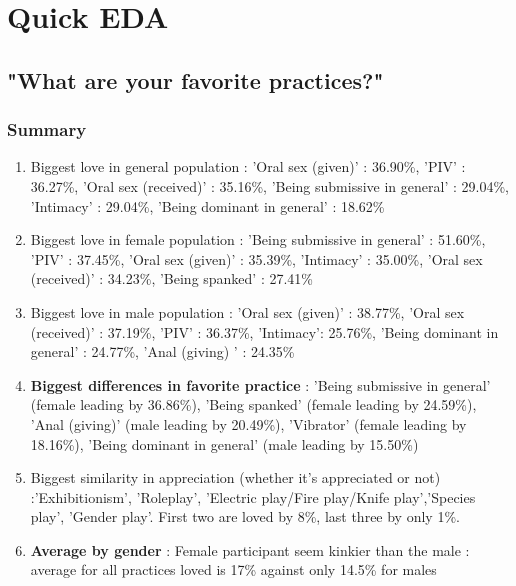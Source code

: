 \documentclass[10pt,a4paper]{article}
\begin{document}
\section{Quick EDA}


\subsection{"What are your favorite practices?"}
\subsubsection{Summary}
\begin{enumerate}
\item{Biggest love in general population : 'Oral sex (given)' : 36.90\%, 'PIV' : 36.27\%, 'Oral sex (received)' : 35.16\%, 'Being submissive in general' : 29.04\%, 'Intimacy' : 29.04\%, 'Being dominant in general' : 18.62\%} 

\item{Biggest love in female population  : 'Being submissive in general' : 51.60\%, 'PIV' : 37.45\%, 'Oral sex (given)' : 35.39\%, 'Intimacy' : 35.00\%, 'Oral sex (received)' : 34.23\%, 'Being spanked' : 27.41\%} 

\item{Biggest love in male population : 'Oral sex (given)' : 38.77\%,  'Oral sex (received)' : 37.19\%, 'PIV' : 36.37\%, 'Intimacy': 25.76\%, 'Being dominant in general' : 24.77\%, 'Anal (giving) ' : 24.35\%}

\item{\textbf{Biggest differences in favorite practice} : 'Being submissive in general' (female leading by 36.86\%), 'Being spanked' (female leading by 24.59\%), 'Anal (giving)'  (male leading by 20.49\%), 'Vibrator'  (female leading by 18.16\%), 'Being dominant in general' (male leading by 15.50\%)}

\item{Biggest similarity in appreciation (whether it's appreciated or not) :'Exhibitionism', 'Roleplay', 'Electric play/Fire play/Knife play','Species play', 'Gender play'.} First two are loved by 8\%, last three by only 1\%.

\item{\textbf{Average by gender} : Female participant seem kinkier than the male : average for all practices loved is 17\% against only 14.5\% for males}
\end{enumerate}
\end{document}
